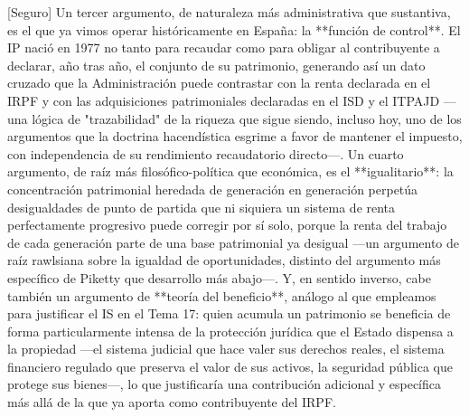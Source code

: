 \documentclass[10pt,a4paper]{article}
\begin{document}
[Seguro] Un tercer argumento, de naturaleza más administrativa que sustantiva, es el que ya vimos operar históricamente en España: la **función de control**. El IP nació en 1977 no tanto para recaudar como para obligar al contribuyente a declarar, año tras año, el conjunto de su patrimonio, generando así un dato cruzado que la Administración puede contrastar con la renta declarada en el IRPF y con las adquisiciones patrimoniales declaradas en el ISD y el ITPAJD —una lógica de "trazabilidad" de la riqueza que sigue siendo, incluso hoy, uno de los argumentos que la doctrina hacendística esgrime a favor de mantener el impuesto, con independencia de su rendimiento recaudatorio directo—. Un cuarto argumento, de raíz más filosófico-política que económica, es el **igualitario**: la concentración patrimonial heredada de generación en generación perpetúa desigualdades de punto de partida que ni siquiera un sistema de renta perfectamente progresivo puede corregir por sí solo, porque la renta del trabajo de cada generación parte de una base patrimonial ya desigual —un argumento de raíz rawlsiana sobre la igualdad de oportunidades, distinto del argumento más específico de Piketty que desarrollo más abajo—. Y, en sentido inverso, cabe también un argumento de **teoría del beneficio**, análogo al que empleamos para justificar el IS en el Tema 17: quien acumula un patrimonio se beneficia de forma particularmente intensa de la protección jurídica que el Estado dispensa a la propiedad —el sistema judicial que hace valer sus derechos reales, el sistema financiero regulado que preserva el valor de sus activos, la seguridad pública que protege sus bienes—, lo que justificaría una contribución adicional y específica más allá de la que ya aporta como contribuyente del IRPF.
\end{document}
